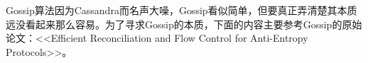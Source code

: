 \documentclass[a4paper,12pt]{article}
\begin{document}
Gossip算法因为Cassandra而名声大噪，Gossip看似简单，但要真正弄清楚其本质远没看起来那么容易。为了寻求Gossip的本质，下面的内容主要参考Gossip的原始论文：<<Efficient Reconciliation and Flow Control for Anti-Entropy Protocols>>。
\end{document}
